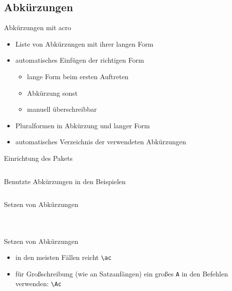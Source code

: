 \documentclass[presentation,aspectratio=169]{beamer}
\begin{document}
\subsection{Abkürzungen}

\begin{frame}{Abkürzungen mit acro}
  \begin{itemize}
    \item Liste von Abkürzungen mit ihrer langen Form
    \item automatisches Einfügen der richtigen Form
      \begin{itemize}
        \item lange Form beim ersten Auftreten
        \item Abkürzung sonst
        \item manuell überschreibbar
      \end{itemize}
    \item Pluralformen in Abkürzung und langer Form
    \item automatisches Verzeichnis der verwendeten Abkürzungen
  \end{itemize}
\end{frame}

\begin{frame}[fragile]{Einrichtung des Pakets}
  \inputminted{latex}{codebeispiele/acro-setup.tex}
\end{frame}

\begin{frame}[fragile]{Benutzte Abkürzungen in den Beispielen}
  \inputminted{latex}{codebeispiele/acro-used-acronyms.tex}
\end{frame}

\begin{frame}[fragile]{Setzen von Abkürzungen}
  \begin{columns}
    \begin{column}{.49\textwidth}
      
    \end{column}
    \begin{column}{.5\textwidth}
      \inputminted{latex}{codebeispiele/acro-usage.tex}
    \end{column}
  \end{columns}
\end{frame}

\begin{frame}[fragile]{Setzen von Abkürzungen}
  \begin{itemize}
    \item in den meisten Fällen reicht \verb|\ac|
    \item für Großschreibung (wie an Satzanfängen) ein großes \verb|A| in den Befehlen verwenden: \verb|\Ac|
  \end{itemize}
\end{frame}
\end{document}
